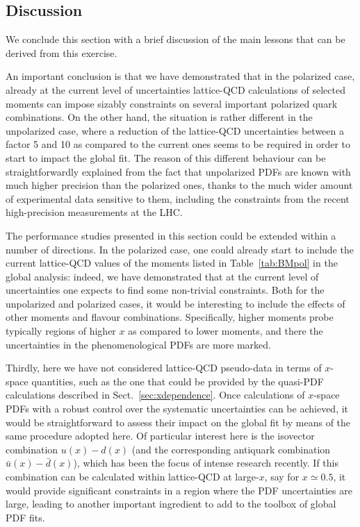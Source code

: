 

\subsection{Discussion}

We conclude this section with a brief discussion of the main lessons that
can be derived from this exercise.

An important conclusion is that we have demonstrated that in the polarized case,
already at the current level of uncertainties lattice-QCD calculations of
selected moments can impose sizably constraints on several
important polarized quark combinations.
%
On the other hand, the situation is rather different in the unpolarized case,
where a reduction of the lattice-QCD uncertainties between a factor 5 and 10 as compared
to the current ones seems to be required in order to start to impact the global
fit.
%
The reason of this different behaviour can be straightforwardly explained from
the fact that unpolarized PDFs are known with much higher precision than the polarized
ones, thanks to the much wider amount of experimental data sensitive to them,
including the constraints from the recent high-precision measurements at the
LHC.

The performance studies presented in this section could be extended within
a number of directions.
%
In the polarized case, one could already start to include the current lattice-QCD
values of the moments listed in Table~\ref{tab:BMpol} in the global analysis: indeed,
we have demonstrated that at the current level of uncertainties one expects
to find some non-trivial constraints.
%
Both for the unpolarized and polarized cases, it would be interesting to include the effects
of other moments and flavour combinations.
%
Specifically, higher moments probe typically regions of higher $x$ as compared
to lower moments, and there the uncertainties in the phenomenological PDFs are
more marked.


Thirdly, here we have not considered lattice-QCD pseudo-data in terms of $x$-space
quantities, such as the one that could be provided by the quasi-PDF calculations
described in Sect.~\ref{sec:xdependence}.
%
Once calculations of $x$-space PDFs with a robust control over the systematic
uncertainties can be achieved, it would be straightforward to assess their
impact on the global fit by means of the same procedure adopted here.
%
Of particular interest here is the isovector combination $u(x)-d(x)$
(and the corresponding antiquark combination $\bar{u}(x)-\bar{d}(x)$), which
has been the focus of intense research recently.
%
If this combination can be calculated within lattice-QCD at large-$x$,
say for $x\simeq 0.5$, it would
provide significant constraints in a region where the PDF uncertainties are large,
leading to another important ingredient to add to the toolbox
of global PDF fits.

